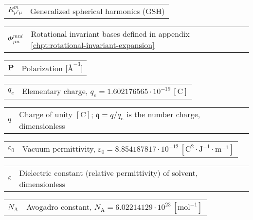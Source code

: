 \hspace{-1.5em}%
\begin{tabular}{>{\raggedright}p{3.3em}l}
$R_{\mu'\mu}^{m}$ & Generalized spherical harmonics (GSH)\tabularnewline
\end{tabular}

\hspace{-1.5em}%
\begin{tabular}{>{\raggedright}p{3.3em}l}
$\Phi_{\mu u}^{mnl}$ & Rotational invariant bases defined in appendix \ref{chpt:rotational-invariant-expansion}\tabularnewline
\end{tabular}

\hspace{-1.5em}%
\begin{tabular}{>{\raggedright}p{3.3em}l}
$\mathbf{P}$ & Polarization {[}$\mathrm{\textrm{\AA}^{-3}}${]}\tabularnewline
\end{tabular}

\hspace{-1.5em}%
\begin{tabular}{>{\raggedright}p{3.3em}l}
$q_{e}$ & Elementary charge, $q_{e}=1.602176565\cdot10^{-19}\,\mathrm{[C]}$\tabularnewline
\end{tabular}

\hspace{-1.5em}%
\begin{tabular}{>{\raggedright}p{3.3em}l}
$q$ & Charge of unity $\mathrm{[C]}$; $\mathfrak{q}=q/q_{e}$ is the number
charge, dimensionless\tabularnewline
\end{tabular}

\hspace{-1.5em}%
\begin{tabular}{>{\raggedright}p{3.3em}l}
$\varepsilon_{0}$ & Vacuum permittivity, $\varepsilon_{0}=8.854187817\cdot10^{-12}\,\mathrm{[C^{2}\cdot J^{-1}\cdot m^{-1}]}$\tabularnewline
\end{tabular}

\hspace{-1.5em}%
\begin{tabular}{>{\raggedright}p{3.3em}l}
$\varepsilon$ & Dielectric constant (relative permittivity) of solvent, dimensionless\tabularnewline
\end{tabular}

\hspace{-1.5em}%
\begin{tabular}{>{\raggedright}p{3.3em}l}
$N_{\mathrm{A}}$ & Avogadro constant, $N_{\mathrm{A}}=6.02214129\cdot10^{23}\,\mathrm{[mol^{-1}]}$\tabularnewline
\end{tabular}


